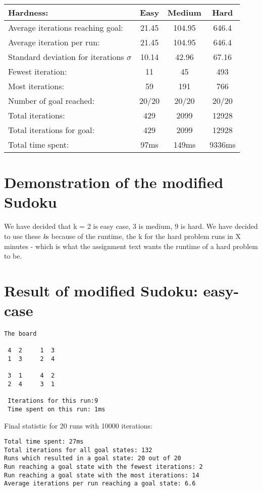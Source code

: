 \documentclass[12pt, a4paper]{article}
\begin{document}
\begin{center}
  \begin{tabular}{| l | c c c|}
    \hline
    Hardness: &\textbf{Easy} & \textbf{Medium} & \textbf{Hard} \\ \hline
    Average iterations reaching goal: & 21.45& 104.95& 646.4\\
    Average iteration per run:  & 21.45 & 104.95 &  646.4\\
    Standard deviation for iterations $\sigma$ & 10.14 & 42.96 & 67.16\\
    Fewest iteration: & 11 & 45& 493\\ 
    Most iterations: & 59 & 191& 766\\ 
    Number of goal reached: & 20/20 & 20/20 & 20/20\\
    Total iterations: & 429 & 2099& 12928\\
    Total iterations for goal: & 429 & 2099& 12928\\
    Total time spent: & 97ms& 149ms & 9336ms\\
    \hline
  \end{tabular}
\end{center}


\section{Demonstration of the modified Sudoku}
We have decided that k = 2 is easy case, 3 is medium, 9 is hard. 
We have decided to use these \textit{k}s because of the runtime, the k for the hard problem runs in X minutes - which is what the assignment text wants the runtime of a hard problem to be.

\section{Result of modified Sudoku: easy-case}
\begin{verbatim}
The board

 4  2     1  3 
 1  3     2  4 

 3  1     4  2 
 2  4     3  1 
 
 Iterations for this run:9
 Time spent on this run: 1ms
\end{verbatim}
Final statistic for 20 runs with 10000 iterations:
\begin{verbatim}
Total time spent: 27ms
Total iterations for all goal states: 132
Runs which resulted in a goal state: 20 out of 20
Run reaching a goal state with the fewest iterations: 2
Run reaching a goal state with the most iterations: 14
Average iterations per run reaching a goal state: 6.6

\end{verbatim}
\end{document}
